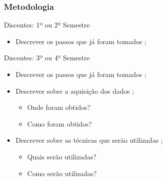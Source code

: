 \documentclass[aspectratio=169]{beamer}
\begin{document}
\begin{frame}
\frametitle{Metodologia}

\begin{block}{Discentes: 1º ou 2º Semestre}
    \begin{itemize}
        \item Descrever os passos que já foram tomados \cite{teste};
    \end{itemize}
\end{block}

\begin{block}{Discentes: 3º ou 4º Semestre}
    \begin{itemize}
        \item Descrever os passos que já foram tomados \cite{teste};
        \item Descrever sobre a aquisição dos dados \cite{teste};
        \begin{itemize}
            \item Onde foram obtidos?
            \item Como foram obtidos?
        \end{itemize}
        \item Descrever sobre as técnicas que serão utilizadas \cite{teste};
        \begin{itemize}
            \item Quais serão utilizadas?
            \item Como serão utilizadas?
        \end{itemize}
    \end{itemize}
\end{block}

\end{frame}
\end{document}
